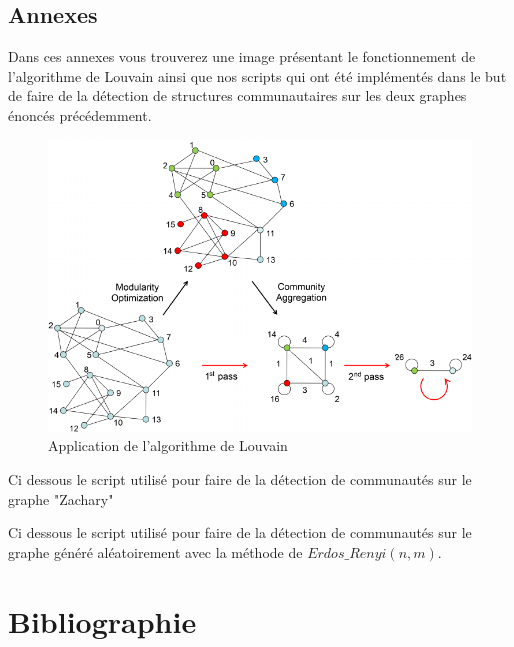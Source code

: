 \documentclass[frenchb]{report}
\newcommand{\1}{\mathbbm{1}}
\theoremstyle{definition}\newtheorem{defn}{Définition}
\theoremstyle{definition}\newtheorem{exm}{Exemple}
\theoremstyle{definition}\newtheorem{nota}{Notation}
\theoremstyle{definition}\newtheorem{rem}{Remarque}
\begin{document}
\section*{Annexes}

Dans ces annexes vous trouverez une image présentant le fonctionnement de l'algorithme de Louvain ainsi que nos scripts qui ont été implémentés dans le but de faire de la détection de structures communautaires sur les deux graphes énoncés précédemment.

\begin{figure}[H]
	\centering
	\includegraphics[scale=0.5]{images/Louvain.png}
	\caption{Application de l'algorithme de Louvain}
\end{figure}

\pagebreak

Ci dessous le script utilisé pour faire de la détection de communautés sur le graphe "Zachary"



\pagebreak

Ci dessous le script utilisé pour faire de la détection de communautés sur le graphe généré aléatoirement avec la méthode de $Erdos\_Renyi(n,m)$.



\chapter*{Bibliographie}
\end{document}
